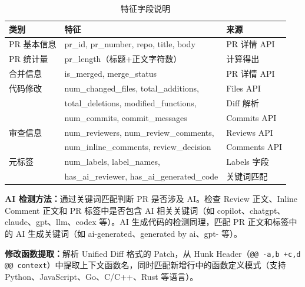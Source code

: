\documentclass{experimentreport}
\begin{document}
{\begin{table}[ht]
\centering
\caption{特征字段说明}
\begin{tabular}{|l|l|l|}
\hline
\textbf{类别} & \textbf{特征} & \textbf{来源} \\
\hline
PR 基本信息 & pr\_id, pr\_number, repo, title, body & PR 详情 API \\
\hline
PR 统计量 & pr\_length（标题+正文字符数） & 计算得出 \\
\hline
合并信息 & is\_merged, merge\_status & PR 详情 API \\
\hline
代码修改 & num\_changed\_files, total\_additions, & Files API \\
& total\_deletions, modified\_functions, & Diff 解析 \\
& num\_commits, commit\_messages & Commits API \\
\hline
审查信息 & num\_reviewers, num\_review\_comments, & Reviews API \\
& num\_inline\_comments, review\_decision & Comments API \\
\hline
元标签 & num\_labels, label\_names, & Labels 字段 \\
& has\_ai\_reviewer, has\_ai\_generated\_code & 关键词匹配 \\
\hline
\end{tabular}
\end{table}

\textbf{AI 检测方法：}通过关键词匹配判断 PR 是否涉及 AI。检查 Review 正文、Inline Comment 正文和 PR 标签中是否包含 AI 相关关键词（如 copilot、chatgpt、claude、gpt、llm、codex 等）。AI 生成代码的检测同理，匹配 PR 正文和标签中的 AI 生成关键词（如 ai-generated、generated by ai、gpt- 等）。

\textbf{修改函数提取：}解析 Unified Diff 格式的 Patch，从 Hunk Header（\texttt{@@ -a,b +c,d @@ context}）中提取上下文函数名，同时匹配新增行中的函数定义模式（支持 Python、JavaScript、Go、C/C++、Rust 等语言）。

}

\end{document}
